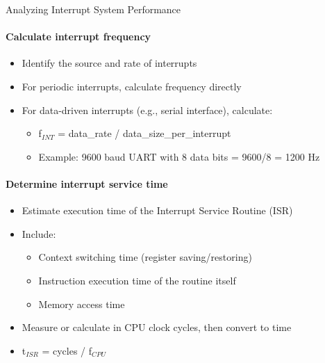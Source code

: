 \begin{KR}{Analyzing Interrupt System Performance}\\
\paragraph{Calculate interrupt frequency}
\begin{itemize}
    \item Identify the source and rate of interrupts
    \item For periodic interrupts, calculate frequency directly
    \item For data-driven interrupts (e.g., serial interface), calculate:
    \begin{itemize}
        \item f$_{INT}$ = data\_rate / data\_size\_per\_interrupt
        \item Example: 9600 baud UART with 8 data bits = 9600/8 = 1200 Hz
    \end{itemize}
\end{itemize}

\paragraph{Determine interrupt service time}
\begin{itemize}
    \item Estimate execution time of the Interrupt Service Routine (ISR)
    \item Include:
    \begin{itemize}
        \item Context switching time (register saving/restoring)
        \item Instruction execution time of the routine itself
        \item Memory access time
    \end{itemize}
    \item Measure or calculate in CPU clock cycles, then convert to time
    \item t$_{ISR}$ = cycles / f$_{CPU}$
\end{itemize}


\end{KR}
